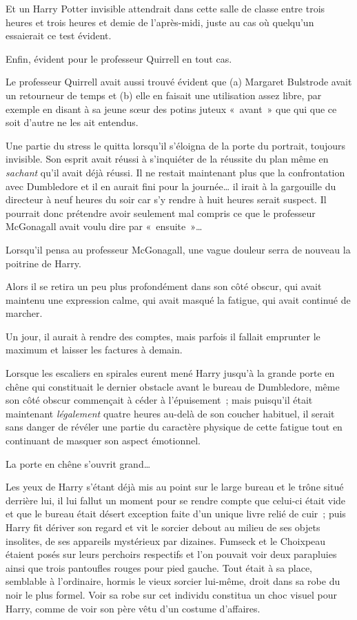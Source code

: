 Et un Harry Potter invisible attendrait dans cette salle de classe entre trois heures et trois heures et demie de l'après-midi, juste au cas où quelqu'un essaierait ce test évident.

Enfin, évident pour le professeur Quirrell en tout cas.

Le professeur Quirrell avait aussi trouvé évident que (a) Margaret Bulstrode avait un retourneur de temps et (b) elle en faisait une utilisation assez libre, par exemple en disant à sa jeune sœur des potins juteux «~avant~» que qui que ce soit d'autre ne les ait entendus.

Une partie du stress le quitta lorsqu'il s'éloigna de la porte du portrait, toujours invisible.
Son esprit avait réussi à s'inquiéter de la réussite du plan même en \emph{sachant} qu'il avait déjà réussi.
Il ne restait maintenant plus que la confrontation avec Dumbledore et il en aurait fini pour la journée… il irait à la gargouille du directeur à neuf heures du soir car s'y rendre à huit heures serait suspect.
Il pourrait donc prétendre avoir seulement mal compris ce que le professeur McGonagall avait voulu dire par «~ensuite~»…

Lorsqu'il pensa au professeur McGonagall, une vague douleur serra de nouveau la poitrine de Harry.

Alors il se retira un peu plus profondément dans son côté obscur, qui avait maintenu une expression calme, qui avait masqué la fatigue, qui avait continué de marcher.

Un jour, il aurait à rendre des comptes, mais parfois il fallait emprunter le maximum et laisser les factures à demain.

\later

Lorsque les escaliers en spirales eurent mené Harry jusqu'à la grande porte en chêne qui constituait le dernier obstacle avant le bureau de Dumbledore, même son côté obscur commençait à céder à l'épuisement~; mais puisqu'il était maintenant \emph{légalement} quatre heures au-delà de son coucher habituel, il serait sans danger de révéler une partie du caractère physique de cette fatigue tout en continuant de masquer son aspect émotionnel.

La porte en chêne s'ouvrit grand…

Les yeux de Harry s'étant déjà mis au point sur le large bureau et le trône situé derrière lui, il lui fallut un moment pour se rendre compte que celui-ci était vide et que le bureau était désert exception faite d'un unique livre relié de cuir~; puis Harry fit dériver son regard et vit le sorcier debout au milieu de ses objets insolites, de ses appareils mystérieux par dizaines.
Fumseck et le Choixpeau étaient posés sur leurs perchoirs respectifs et l'on pouvait voir deux parapluies ainsi que trois pantoufles rouges pour pied gauche.
Tout était à sa place, semblable à l'ordinaire, hormis le vieux sorcier lui-même, droit dans sa robe du noir le plus formel.
Voir sa robe sur cet individu constitua un choc visuel pour Harry, comme de voir son père vêtu d'un costume d'affaires.

